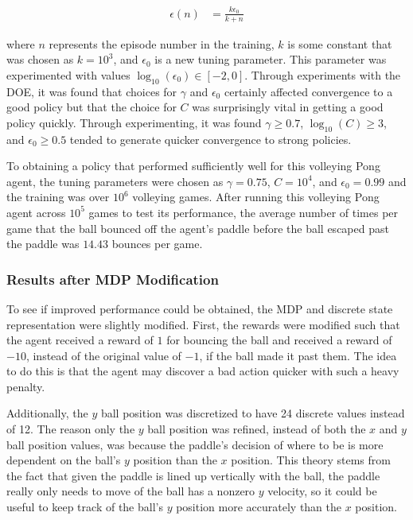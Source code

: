 \documentclass{article}[12pt]
\begin{document}
   \begin{align*}
   \epsilon(n) &= \frac{k \epsilon_0}{k + n}
   \end{align*}
   
   where $n$ represents the episode number in the training, $k$ is some constant that was chosen as $k = 10^3$, and $\epsilon_0$ is a new tuning parameter. This parameter was experimented with values $\log_{10}(\epsilon_0) \in [-2,0]$. Through experiments with the DOE, it was found that choices for $\gamma$ and $\epsilon_0$ certainly affected convergence to a good policy but that the choice for $C$ was surprisingly vital in getting a good policy quickly. Through experimenting, it was found $\gamma \geq 0.7$, $\log_{10}(C) \geq 3$, and $\epsilon_0 \geq 0.5$ tended to generate quicker convergence to strong policies.  
   
   To obtaining a policy that performed sufficiently well for this volleying Pong agent, the tuning parameters were chosen as $\gamma = 0.75$, $C = 10^4$, and $\epsilon_0 = 0.99$ and the training was over $10^6$ volleying games. After running this volleying Pong agent across $10^5$ games to test its performance, the average number of times per game that the ball bounced off the agent's paddle before the ball escaped past the paddle was $14.43$ bounces per game.
   
   \subsubsection{Results after MDP Modification}
   To see if improved performance could be obtained, the MDP and discrete state representation were slightly modified. First, the rewards were modified such that the agent received a reward of $1$ for bouncing the ball and received a reward of $-10$, instead of the original value of $-1$, if the ball made it past them. The idea to do this is that the agent may discover a bad action quicker with such a heavy penalty. 
   
   Additionally, the $y$ ball position was discretized to have 24 discrete values instead of 12. The reason only the $y$ ball position was refined, instead of both the $x$ and $y$ ball position values, was because the paddle's decision of where to be is more dependent on the ball's $y$ position than the $x$ position. This theory stems from the fact that given the paddle is lined up vertically with the ball, the paddle really only needs to move of the ball has a nonzero $y$ velocity, so it could be useful to keep track of the ball's $y$ position more accurately than the $x$ position.
   
\end{document}
